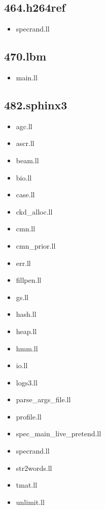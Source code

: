 \begin{multicols}{3}
	\subsection{464.h264ref}
	\begin{itemize}
		\item specrand.ll
	\end{itemize}

	\subsection{470.lbm}
	\begin{itemize}
		\item main.ll
	\end{itemize}

	\subsection{482.sphinx3}
	\begin{itemize}
		\item agc.ll
		\item ascr.ll
		\item beam.ll
		\item bio.ll
		\item case.ll
		\item ckd\_alloc.ll
		\item cmn.ll
		\item cmn\_prior.ll
		\item err.ll
		\item fillpen.ll
		\item gs.ll
		\item hash.ll
		\item heap.ll
		\item hmm.ll
		\item io.ll
		\item logs3.ll
		\item parse\_args\_file.ll
		\item profile.ll
		\item spec\_main\_live\_pretend.ll
		\item specrand.ll
		\item str2words.ll
		\item tmat.ll
		\item unlimit.ll
	\end{itemize}
\end{multicols}
